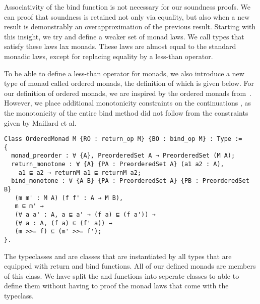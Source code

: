 Associativity of the bind function is not necessary for our soundness proofs.
We can proof that soundness is retained not only via equality, but also when a
new result is demonstrably an overapproximation of the previous result.
Starting with this insight, we try and define a weaker set of monad laws. We
call types that satisfy these laws lax monads. These laws are almost equal to
the standard monadic laws, except for replacing equality by a less-than
operator.

To be able to define a less-than operator for monads, we also introduce a new
type of monad called ordered monads, the definition of which is given below.
For our definition of ordered monads, we are inspired by the ordered monads
from~\cite{maillard2019dijkstra}. However, we place additional monotonicity 
constraints on the continuations , as the monotonicity of the entire
bind method did not follow from the constraints given by Maillard et al.

\begin{verbatim}
Class OrderedMonad M {RO : return_op M} {BO : bind_op M} : Type :=
{
  monad_preorder : ∀ {A}, PreorderedSet A → PreorderedSet (M A);
  return_monotone : ∀ {A} {PA : PreorderedSet A} (a1 a2 : A),
    a1 ⊑ a2 → returnM a1 ⊑ returnM a2;
  bind_monotone : ∀ {A B} {PA : PreorderedSet A} {PB : PreorderedSet B} 
   (m m' : M A) (f f' : A → M B),
   m ⊑ m' → 
   (∀ a a' : A, a ⊑ a' → (f a) ⊑ (f a')) → 
   (∀ a : A, (f a) ⊑ (f' a)) →
   (m >>= f) ⊑ (m' >>= f');
}.
\end{verbatim}

The typeclasses  and  are classes that are
instantiated by all types that are equipped with return and bind functions. All
of our defined monads are members of this class. We have split the  and  functions into seperate classes to able to define them
without having to proof the monad laws that come with the 
typeclass.
